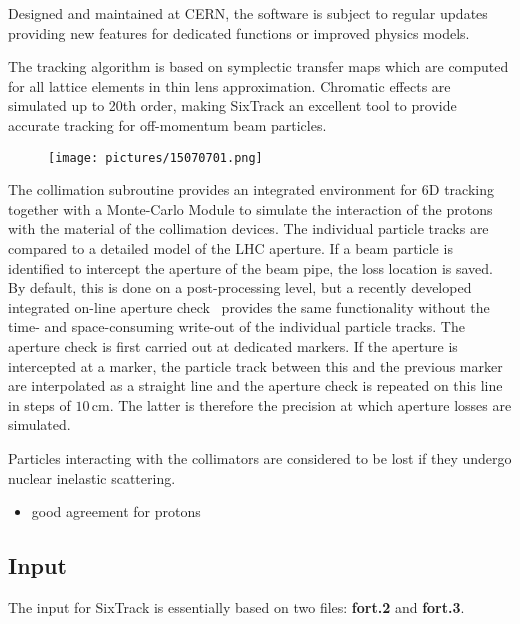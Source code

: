 Designed and maintained at CERN, the software is subject to regular updates providing new features for dedicated functions or improved physics models. 

The tracking algorithm is based on symplectic transfer maps which are computed for all lattice elements in thin lens approximation. Chromatic effects are simulated up to 20th order, making SixTrack an excellent tool to provide accurate tracking for off-momentum beam particles. 


  \begin{figure}[t]
  \centering
  \texttt{[image: pictures/15070701.png]}
  \caption{}  
  \label{pic:15070701}
  \end{figure}

The collimation subroutine provides an integrated environment for 6D tracking together with a Monte-Carlo Module to simulate the interaction of the protons with the material of the collimation devices. The individual particle tracks are compared to a detailed model of the LHC aperture. If a beam particle is identified to intercept the aperture of the beam pipe, the loss location is saved. By default, this is done on a post-processing level, but a recently developed integrated on-line aperture check~\cite{} provides the same functionality without the time- and space-consuming write-out of the individual particle tracks. The aperture check is first carried out at dedicated markers. If the aperture is intercepted at a marker, the particle track between this and the previous marker are interpolated as a straight line and the aperture check is repeated on this line in steps of $10\,$cm. The latter is therefore the precision at which aperture losses are simulated. 

Particles interacting with the collimators are considered to be lost if they undergo nuclear inelastic scattering. 

\begin{itemize}
\item good agreement for protons

\end{itemize}





\subsection{Input}

The input for SixTrack is essentially based on two files: \textbf{fort.2} and \textbf{fort.3}.



